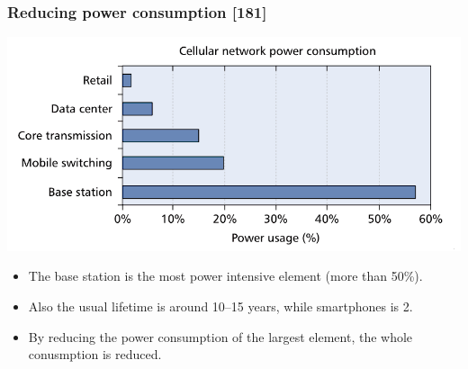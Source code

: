 \documentclass[a4paper,12pt,handout]{beamer}
\begin{document}
\note{}
\begin{frame}
\frametitle{Reducing power consumption [181]}
	\begin{center}
	\includegraphics[scale=1]{consumption.png}
	\end{center}

\begin{itemize}

	\item The base station is the most power intensive element (more than 50\%).
	\item Also the usual lifetime is around 10--15 years, while smartphones is 2.
	\item By reducing the power consumption of the largest element, the whole 
	conusmption is reduced.

\end{itemize}
\end{frame}
\note{}
\end{document}
